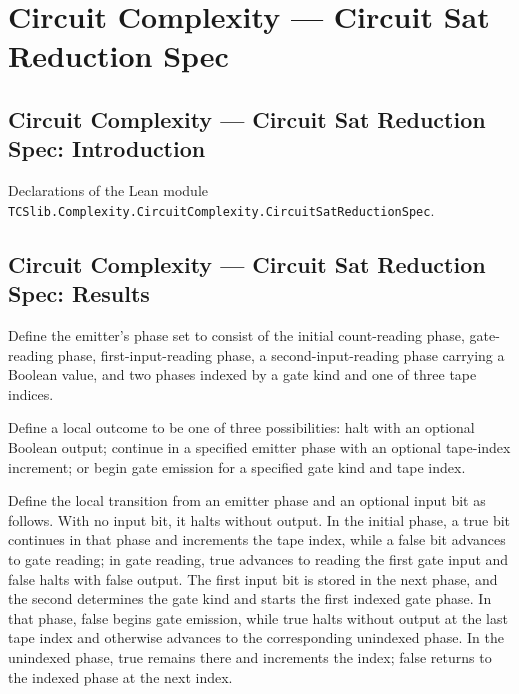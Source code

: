 \section{Circuit Complexity --- Circuit Sat Reduction Spec}
\subsection*{Circuit Complexity --- Circuit Sat Reduction Spec: Introduction}

Declarations of the Lean module \texttt{TCSlib.Complexity.CircuitComplexity.CircuitSatReductionSpec}.

\subsection*{Circuit Complexity --- Circuit Sat Reduction Spec: Results}

\begin{definition}
\label{BoolCircuit.CktSatReduction.Emitter.Ph}
\leanok
{}
Define the emitter’s phase set to consist of the initial count-reading phase,
gate-reading phase, first-input-reading phase, a second-input-reading phase carrying a
Boolean value, and two phases indexed by a gate kind and one of three tape indices.
\end{definition}

\begin{definition}
\label{BoolCircuit.CktSatReduction.Emitter.LA}
\leanok
{}
Define a local outcome to be one of three possibilities: halt with an optional Boolean
output; continue in a specified emitter phase with an optional tape-index increment; or
begin gate emission for a specified gate kind and tape index.
\end{definition}

\begin{definition}
\label{BoolCircuit.CktSatReduction.Emitter.lstep}
\leanok
{}
Define the local transition from an emitter phase and an optional input bit as follows.
With no input bit, it halts without output. In the initial phase, a true bit continues
in that phase and increments the tape index, while a false bit advances to gate reading;
in gate reading, true advances to reading the first gate input and false halts with
false output. The first input bit is stored in the next phase, and the second determines
the gate kind and starts the first indexed gate phase. In that phase, false begins gate
emission, while true halts without output at the last tape index and otherwise advances
to the corresponding unindexed phase. In the unindexed phase, true remains there and
increments the index; false returns to the indexed phase at the next index.
\end{definition}

